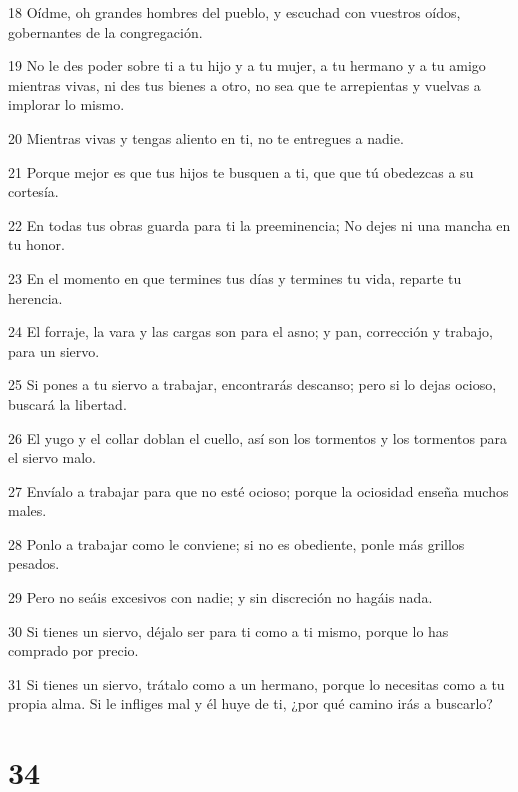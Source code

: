\par 18 Oídme, oh grandes hombres del pueblo, y escuchad con vuestros oídos, gobernantes de la congregación.
\par 19 No le des poder sobre ti a tu hijo y a tu mujer, a tu hermano y a tu amigo mientras vivas, ni des tus bienes a otro, no sea que te arrepientas y vuelvas a implorar lo mismo.
\par 20 Mientras vivas y tengas aliento en ti, no te entregues a nadie.
\par 21 Porque mejor es que tus hijos te busquen a ti, que que tú obedezcas a su cortesía.
\par 22 En todas tus obras guarda para ti la preeminencia; No dejes ni una mancha en tu honor.
\par 23 En el momento en que termines tus días y termines tu vida, reparte tu herencia.
\par 24 El forraje, la vara y las cargas son para el asno; y pan, corrección y trabajo, para un siervo.
\par 25 Si pones a tu siervo a trabajar, encontrarás descanso; pero si lo dejas ocioso, buscará la libertad.
\par 26 El yugo y el collar doblan el cuello, así son los tormentos y los tormentos para el siervo malo.
\par 27 Envíalo a trabajar para que no esté ocioso; porque la ociosidad enseña muchos males.
\par 28 Ponlo a trabajar como le conviene; si no es obediente, ponle más grillos pesados.
\par 29 Pero no seáis excesivos con nadie; y sin discreción no hagáis nada.
\par 30 Si tienes un siervo, déjalo ser para ti como a ti mismo, porque lo has comprado por precio.
\par 31 Si tienes un siervo, trátalo como a un hermano, porque lo necesitas como a tu propia alma. Si le infliges mal y él huye de ti, ¿por qué camino irás a buscarlo?

\chapter{34}

